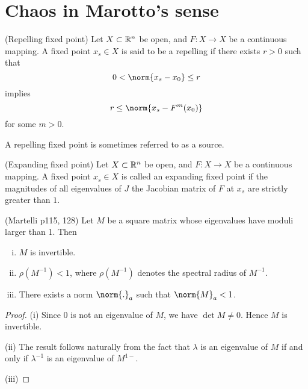 \documentclass[11pt]{book}
\begin{document}
\section{Chaos in Marotto's sense}

\begin{definition}
  (Repelling fixed point)
  Let $X \subset \mathbb{R}^n$ be open, and $F: X \to X$ be a continuous mapping. 
  A fixed point $x_s \in X$ is said to be a repelling if there exists $r > 0$
  such that 
  \begin{equation*}
    0 < \norm{x_s - x_0} \leq r
  \end{equation*}
implies
\begin{equation*}
  r \leq \norm{x_s - F^m(x_0)}
\end{equation*}
for some $m > 0$.
\end{definition}
A repelling fixed point is sometimes referred to as a source.

\begin{definition}
  (Expanding fixed point)
  Let $X \subset \mathbb{R}^n$ be open, and $F: X \to X$ be a continuous mapping. 
  A fixed point $x_s \in  X$ is called an expanding fixed point if
  the magnitudes of all eigenvalues of $J$ the Jacobian matrix of $F$ at $x_s$ are strictly greater than $1$.
\end{definition}

\begin{lemma}
  (Martelli p115, 128)
  Let $M$ be a square matrix whose eigenvalues have moduli larger than 1.
  Then 
  \begin{enumerate}[(i)]
    \item $M$ is invertible.
    \item $\rho(M^{-1}) < 1$, where $\rho(M^{-1})$ denotes the spectral radius of $M^{-1}$.
    \item There exists a norm $\norm{.}_a$ such that $\norm{M}_a < 1$.
    
  \end{enumerate}
\end{lemma}
\begin{proof}
  (i) Since $0$ is not an eigenvalue of $M$, we have $\det M \neq 0$.
  Hence $M$ is invertible.

  (ii) The result follows naturally from the fact that
  $\lambda$ is an eigenvalue of $M$ if and only if $\lambda^{-1}$ is an eigenvalue of $M^{1-}$.

  (iii) 
\end{proof}
\end{document}
